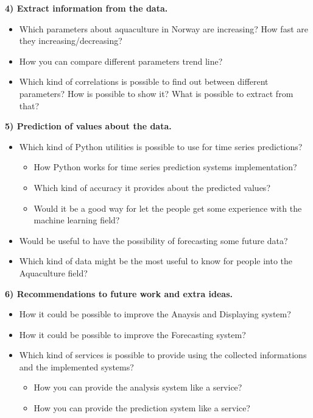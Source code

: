 \newpage

\textbf{4) Extract information from the data.}
\vspace{-5mm}
\begin{itemize}
 \setlength{\itemsep}{-5pt}
  \item Which parameters about aquaculture in Norway are increasing? How fast are they increasing/decreasing? 
  \item How you can compare different parameters trend line?
  \item Which kind of correlations is possible to find out between different parameters? How is possible to show it? What is possible to extract from that?
 \end{itemize}
 
\textbf{5) Prediction of values about the data.}
\vspace{-5mm}
\begin{itemize}
 \setlength{\itemsep}{-5pt} 
  \item Which kind of Python utilities is possible to use for time series predictions?
  		\vspace{-3mm}
		\begin{itemize}
 		\setlength{\itemsep}{-5pt}	
		  \item How Python works for time series prediction systems implementation?
		  \item Which kind of accuracy it provides about the predicted values?
		  \item Would it be a good way for let the people get some experience with the machine learning field? 
		\end{itemize}
  \item Would be useful to have the possibility of forecasting some future data? 
  \item Which kind of data might be the most useful to know for people into the Aquaculture field?
	
 \end{itemize}

\textbf{6) Recommendations to future work and extra ideas.}
\vspace{-5mm}
\begin{itemize}
\setlength{\itemsep}{-5pt}
	\item How it could be possible to improve the Anaysis and Displaying system?
	\item How it could be possible to improve the Forecasting system?
	\item Which kind of services is possible to provide using the collected informations and the implemented systems?
  		\vspace{-3mm}
		\begin{itemize}
 		\setlength{\itemsep}{-5pt}	
		  	\item How you can provide the analysis system like a service?
		  	\item How you can provide the prediction system like a service?
		\end{itemize}
 \end{itemize}

